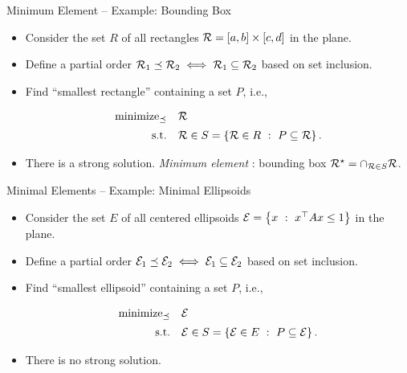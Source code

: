 \documentclass[9pt]{beamer}
\begin{document}
\begin{frame}{Minimum Element -- Example: Bounding Box}

  \begin{itemize}
    \setlength{\itemsep}{1.5em}
  \item Consider the set $R$ of all rectangles $\mathcal R = [a, b]\times [c, d]$ in the plane.

  \item Define a partial order $\mathcal R_1 \preceq \mathcal R_2 \iff \mathcal R_1\subseteq \mathcal R_2$ based on set inclusion.

  \item

    Find ``smallest rectangle'' containing a set $P$, i.e.,

    \[
      \begin{array}{rl}
        \operatorname{minimize}_{\preceq} & \mathcal R \\[0.5em]
        \mathrm{s.t.} & \mathcal R \in S= \left\{ \mathcal R\in R\ : \ P \subseteq \mathcal R \right\}.
      \end{array}
    \]


  \item<2-> There is a strong solution. \emph{Minimum element} : bounding box $\mathcal R^\star = \cap_{\mathcal R\in S} \mathcal R$.
    
  \end{itemize}  
\end{frame}

\begin{frame}{Minimal Elements -- Example: Minimal Ellipsoids}

  \begin{itemize}
    \setlength{\itemsep}{1.5em}
  \item Consider the set $E$ of all centered ellipsoids $\mathcal E = \left\{ x\ : \ x^\top A x\leq 1 \right\}$ in the plane.

  \item Define a partial order $\mathcal E_1 \preceq \mathcal E_2 \iff \mathcal E_1\subseteq \mathcal E_2$ based on set inclusion.

  \item

  Find ``smallest ellipsoid'' containing a set $P$, i.e.,

  \[
    \begin{array}{rl}
      \operatorname{minimize}_{\preceq} & \mathcal E \\[0.5em]
      \mathrm{s.t.} & \mathcal E \in S= \left\{ \mathcal E\in E\ : \ P \subseteq \mathcal E \right\}.
    \end{array}
  \]

\item<2->There is no strong solution. 
    
    \begin{minipage}{0.5\textwidth}

      \begin{center}
        
      \end{center}
      
    \end{minipage}
  \end{itemize}
  
\end{frame}
\end{document}
